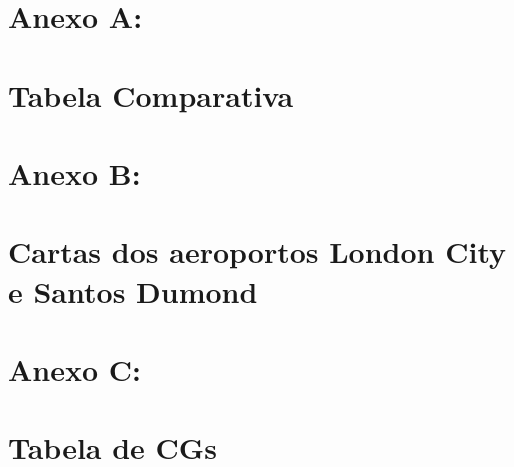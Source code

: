 \part*{Anexo A:\\~\\ Tabela Comparativa}
\label{anexoA}
  

\part*{Anexo B:\\~\\ Cartas dos aeroportos London City e Santos Dumond}
\label{anexoB}
  
  
  

\part*{Anexo C:\\~\\ Tabela de CGs}
\label{anexoA}
  
